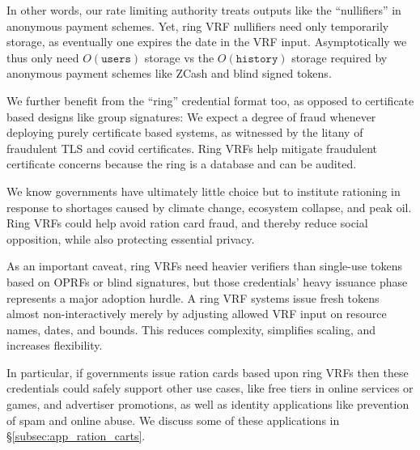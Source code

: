 In other words, our rate limiting authority treats outputs like the
``nullifiers'' in anonymous payment schemes.
Yet, ring VRF nullifiers need only temporarily storage, as eventually one
expires the date in the VRF input.  Asymptotically we thus only need
$O(\mathtt{users})$ storage vs the $O(\mathtt{history})$ storage
required by anonymous payment schemes like ZCash and blind signed tokens.

We further benefit from the ``ring'' credential format too,
 as opposed to certificate based designs like group signatures:\quad 
We expect a degree of fraud whenever deploying purely certificate
based systems, as witnessed by the litany of fraudulent TLS and covid
certificates.  Ring VRFs help mitigate fraudulent certificate concerns
because the ring is a database and can be audited.

We know governments have ultimately little choice but to institute
rationing in response to shortages caused by climate change, ecosystem
collapse, and peak oil.  Ring VRFs could help avoid ration card fraud,
and thereby reduce social opposition, while also protecting essential privacy.

As an important caveat, ring VRFs need heavier verifiers than single-use
tokens based on OPRFs \cite{PrivacyPass} or blind signatures, but
those credentials' heavy issuance phase represents a major adoption hurdle.
A ring VRF systems issue fresh tokens almost non-interactively merely by
adjusting allowed VRF input on resource names, dates, and bounds.
This reduces complexity, simplifies scaling, and increases flexibility.

In particular, if governments issue ration cards based upon ring VRFs
then these credentials could safely support other use cases, like
free tiers in online services or games, and advertiser promotions,
as well as identity applications like prevention of spam and online abuse. We discuss some of these 
applications in \S\ref{subsec:app_ration_carts}.

\begin{comment}
In this, we need authenticated domain separation of products or identity
consumers in queries to users' ring VRF credentials.  We briefly discuss
some sensible patterns in \S\ref{subsec:app_ration_carts} below, but
overall authenticated domain separation resemble TLS certificates except
simpler in that roots of trust can self authenticate if root keys act as
domain separators.
\end{comment}






